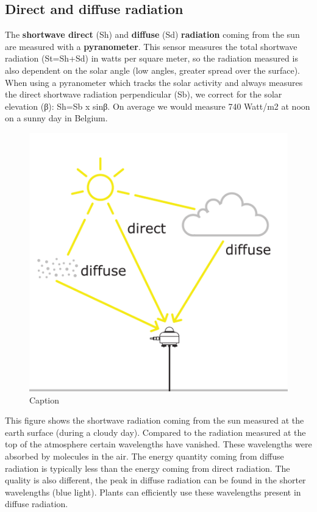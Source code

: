 \documentclass[12pt,oneside]{book}
\begin{document}
\subsection{Direct and diffuse
radiation}\label{direct-and-diffuse-radiation}

The \textbf{shortwave direct} (Sh) and \textbf{diffuse} (Sd)
\textbf{radiation} coming from the sun are measured with a
\textbf{pyranometer}. This sensor measures the total shortwave radiation
(St=Sh+Sd) in watts per square meter, so the radiation measured is also
dependent on the solar angle (low angles, greater spread over the
surface). When using a pyranometer which tracks the solar activity and
always measures the direct shortwave radiation perpendicular (Sb), we
correct for the solar elevation (β): Sh=Sb x sinβ. On average we would
measure 740 Watt/m2 at noon on a sunny day in Belgium.

\begin{figure}

{\centering \includegraphics[width=0.5\linewidth]{figures/Figure127} 

}

\caption{Caption}\label{fig:Diffuse}
\end{figure}

This figure shows the shortwave radiation coming from the sun measured
at the earth surface (during a cloudy day). Compared to the radiation
measured at the top of the atmosphere certain wavelengths have vanished.
These wavelengths were absorbed by molecules in the air. The energy
quantity coming from diffuse radiation is typically less than the energy
coming from direct radiation. The quality is also different, the peak in
diffuse radiation can be found in the shorter wavelengths (blue light).
Plants can efficiently use these wavelengths present in diffuse
radiation.
\end{document}
